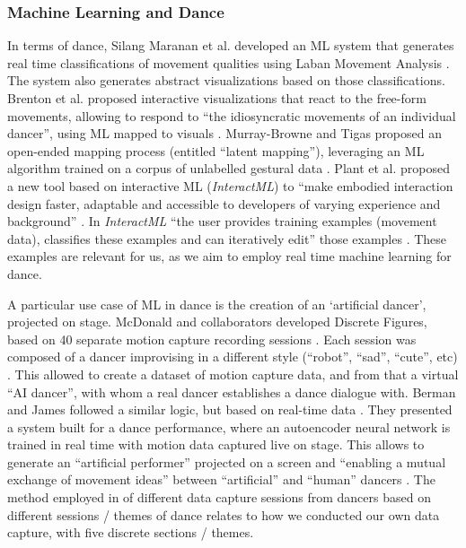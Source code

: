 \subsubsection{Machine Learning and Dance}

In terms of dance, Silang Maranan et al. developed an ML system that generates real time classifications of movement qualities using Laban Movement Analysis \cite{silang_maranan_designing_2014}. The system also generates abstract visualizations based on those classifications. Brenton et al. proposed interactive visualizations that react to the free-form movements, allowing to respond to “the idiosyncratic movements of an individual dancer”, using ML mapped to visuals \cite{brenton_embodied_2014}. Murray-Browne and Tigas proposed an open-ended mapping process (entitled “latent mapping”), leveraging an ML algorithm trained on a corpus of unlabelled gestural data \cite{murray-browne_latent_2021}. Plant et al. proposed a new tool based on interactive ML (\textit{InteractML}) to “make embodied interaction design faster, adaptable and accessible to developers of varying experience and background” \cite{plant_movement_2020}. In \textit{InteractML} “the user provides training examples (movement data), classifies these examples and can iteratively edit” those examples \cite{plant_movement_2020}. These examples are relevant for us, as we aim to employ real time machine learning for dance.

A particular use case of ML in dance is the creation of an ‘artificial dancer’, projected on stage. McDonald and collaborators developed Discrete Figures, based on 40 separate motion capture recording sessions \cite{mcdonald_dance_2018}. Each session was composed of a dancer improvising in a different style (“robot”, “sad”, “cute”, etc) \cite{mcdonald_dance_2018}. This allowed to create a dataset of motion capture data, and from that a virtual “AI dancer”, with whom a real dancer establishes a dance dialogue with. Berman and James followed a similar logic, but based on real-time data \cite{liapis_learning_2018}. They presented a system built for a dance performance, where an autoencoder neural network is trained in real time with motion data captured live on stage. This allows to generate an “artificial performer” projected on a screen and “enabling a mutual exchange of movement ideas” between “artificial” and “human” dancers \cite{liapis_learning_2018}. The method employed in \cite{mcdonald_dance_2018} of different data capture sessions from dancers based on different sessions / themes of dance relates to how we conducted our own data capture, with five discrete sections / themes.

